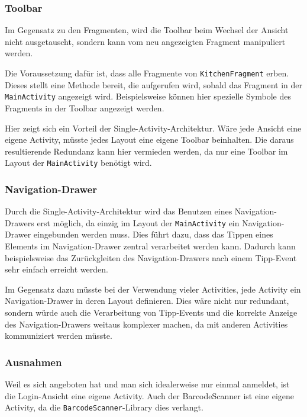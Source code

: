 
\subsubsection{Toolbar}

Im Gegensatz zu den Fragmenten, wird die Toolbar beim Wechsel der Ansicht nicht ausgetauscht, sondern kann vom neu angezeigten Fragment manipuliert werden.

Die Voraussetzung dafür ist, dass alle Fragmente von \texttt{KitchenFragment} erben.
Dieses stellt eine Methode bereit, die aufgerufen wird, sobald das Fragment in der \texttt{MainActivity} angezeigt wird.
Beispielsweise können hier spezielle Symbole des Fragments in der Toolbar angezeigt werden.

Hier zeigt sich ein Vorteil der Single-Activity-Architektur.
Wäre jede Ansicht eine eigene Activity, müsste jedes Layout eine eigene Toolbar beinhalten.
Die daraus resultierende Redundanz kann hier vermieden werden, da nur eine Toolbar im Layout der \texttt{MainActivity} benötigt wird.

\subsubsection{Navigation-Drawer}

Durch die Single-Activity-Architektur wird das Benutzen eines Navigation-Drawers erst möglich, da einzig im Layout der \texttt{MainActivity} ein Navigation-Drawer eingebunden werden muss.
Dies führt dazu, dass das Tippen eines Elements im Navigation-Drawer zentral verarbeitet werden kann.
Dadurch kann beispielsweise das Zurückgleiten des Navigation-Drawers nach einem Tipp-Event sehr einfach erreicht werden.

Im Gegensatz dazu müsste bei der Verwendung vieler Activities, jede Activity ein Navigation-Drawer in deren Layout definieren.
Dies wäre nicht nur redundant, sondern würde auch die Verarbeitung von Tipp-Events und die korrekte Anzeige des Navigation-Drawers weitaus komplexer machen, da mit anderen Activities kommuniziert werden müsste.

\subsubsection{Ausnahmen}

Weil es sich angeboten hat und man sich idealerweise nur einmal anmeldet, ist die Login-Ansicht eine eigene Activity.
Auch der BarcodeScanner ist eine eigene Activity, da die \texttt{BarcodeScanner}-Library dies verlangt.

